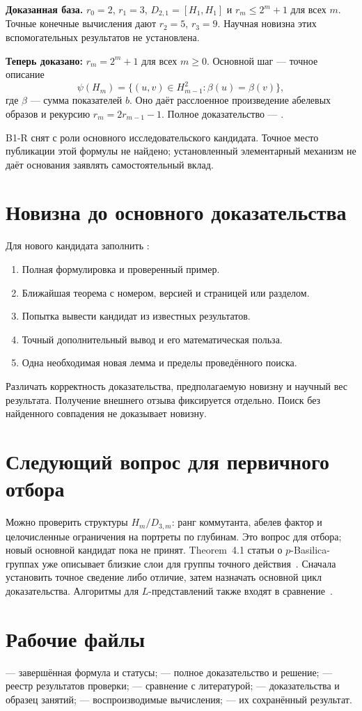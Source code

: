 \textbf{Доказанная база.} \(r_0=2\), \(r_1=3\),
\(D_{2,1}=[H_1,H_1]\) и \(r_m\le2^m+1\) для всех \(m\).
Точные конечные вычисления дают \(r_2=5\), \(r_3=9\).
Научная новизна этих вспомогательных результатов не установлена.

\textbf{Теперь доказано:} \(r_m=2^m+1\) для всех \(m\ge0\).
Основной шаг --- точное описание
\[
\psi(H_m)=\{(u,v)\in H_{m-1}^2:\beta(u)=\beta(v)\},
\]
где \(\beta\) --- сумма показателей \(b\).
Оно даёт расслоенное произведение абелевых образов и рекурсию
\(r_m=2r_{m-1}-1\). Полное доказательство ---
.

B1-R снят с роли основного исследовательского кандидата.
Точное место публикации этой формулы не найдено; установленный
элементарный механизм не даёт основания заявлять самостоятельный вклад.

\section{Новизна до основного доказательства}
Для нового кандидата заполнить :
\begin{enumerate}
\item Полная формулировка и проверенный пример.
\item Ближайшая теорема с номером, версией и страницей или разделом.
\item Попытка вывести кандидат из известных результатов.
\item Точный дополнительный вывод и его математическая польза.
\item Одна необходимая новая лемма и пределы проведённого поиска.
\end{enumerate}
Различать корректность доказательства, предполагаемую новизну
и научный вес результата. Получение внешнего отзыва фиксируется отдельно.
Поиск без найденного совпадения не доказывает новизну.

\section{Следующий вопрос для первичного отбора}
Можно проверить структуры \(H_m/D_{3,m}\): ранг коммутанта,
абелев фактор и целочисленные ограничения на портреты по глубинам.
Это вопрос для отбора; новый основной кандидат пока не принят.
Theorem~4.1 статьи о \(p\)-Basilica-группах уже описывает
близкие слои для группы точного действия~\cite{PBasilica}.
Сначала установить точное сведение либо отличие, затем назначать
основной цикл доказательства. Алгоритмы для
\(L\)-представлений также входят в сравнение~\cite{NilpotentL}.

\section{Рабочие файлы}
 --- завершённая формула и статусы;
 --- полное доказательство и решение;
 --- реестр результатов проверки;
 --- сравнение с литературой;
 --- доказательства и образец занятий;
 --- воспроизводимые вычисления;
 --- их сохранённый результат.
